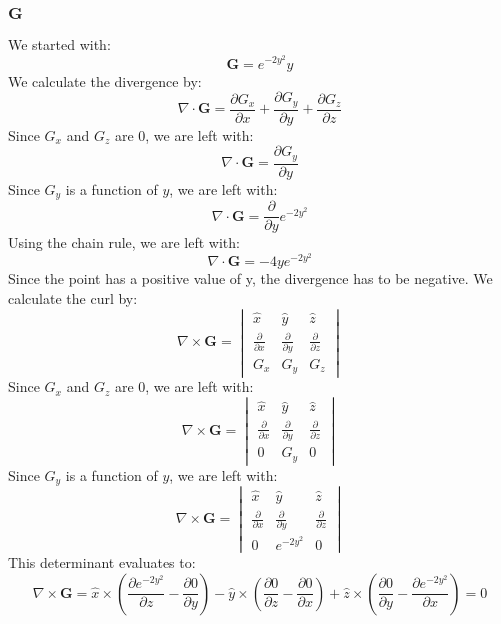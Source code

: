\documentclass{article}
\begin{document}
\subsubsection{$\mathbf{G}$}
We started with:
\begin{equation}
    \mathbf{G}=e^{-2y^{2}}\hat{y}
\end{equation}
We calculate the divergence by:
\begin{equation}
    \nabla \cdot \mathbf{G} = \frac{\partial G_x}{\partial x} + \frac{\partial G_y}{\partial y} + \frac{\partial G_z}{\partial z}
\end{equation}
Since $G_x$ and $G_z$ are 0, we are left with:
\begin{equation}
    \nabla \cdot \mathbf{G} = \frac{\partial G_y}{\partial y}
\end{equation}
Since $G_y$ is a function of $y$, we are left with:
\begin{equation}
    \nabla \cdot \mathbf{G} = \frac{\partial}{\partial y}e^{-2y^{2}}
\end{equation}
Using the chain rule, we are left with:
\begin{equation}
    \nabla \cdot \mathbf{G} = -4y e^{-2y^{2}}
\end{equation}
Since the point has a positive value of y, the divergence has to be negative.
We calculate the curl by:
\begin{equation}
    \nabla \times \mathbf{G} = \begin{vmatrix}
    \hat{x} & \hat{y} & \hat{z}\\
    \frac{\partial}{\partial x} & \frac{\partial}{\partial y} & \frac{\partial}{\partial z}\\
    G_x & G_y & G_z
    \end{vmatrix}
\end{equation}
Since $G_x$ and $G_z$ are 0, we are left with:
\begin{equation}
    \nabla \times \mathbf{G} = \begin{vmatrix}
    \hat{x} & \hat{y} & \hat{z}\\
    \frac{\partial}{\partial x} & \frac{\partial}{\partial y} & \frac{\partial}{\partial z}\\
    0 & G_y & 0
    \end{vmatrix}
\end{equation}
Since $G_y$ is a function of $y$, we are left with:
\begin{equation}
    \nabla \times \mathbf{G} = \begin{vmatrix}
    \hat{x} & \hat{y} & \hat{z}\\
    \frac{\partial}{\partial x} & \frac{\partial}{\partial y} & \frac{\partial}{\partial z}\\
    0 & e^{-2y^{2}} & 0
    \end{vmatrix}
\end{equation}
This determinant evaluates to:
\begin{equation}
    \nabla \times \mathbf{G} = \hat{x}\times\left(\frac{\partial e^{-2y^{2}}}{\partial z}-\frac{\partial 0}{\partial y}\right) - \hat{y}\times\left(\frac{\partial 0}{\partial z}-\frac{\partial 0}{\partial x}\right) + \hat{z}\times\left(\frac{\partial 0}{\partial y}-\frac{\partial e^{-2y^{2}}}{\partial x}\right)=0
\end{equation}
\end{document}
